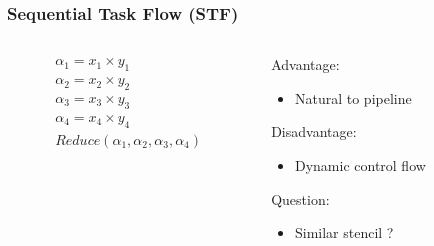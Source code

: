 \documentclass{beamer}
\begin{document}
\begin{frame}
    \frametitle{Sequential Task Flow (STF)}
    \begin{columns}[T]
        \begin{column}{0.5\textwidth}  %
            \begin{minipage}[t][.5\textheight]{\textwidth}
                \begin{center}
                    
                \end{center}
            \end{minipage}\par
            \begin{minipage}[t][.5\textheight]{\textwidth}
                \begin{equation*}
                    \begin{split}
                        \alpha_1 = x_1 \times y_1  \\
                        \alpha_2 = x_2 \times y_2 \\
                        \alpha_3 = x_3 \times y_3 \\
                        \alpha_4 = x_4 \times y_4 \\ 
                        Reduce(\alpha_1,\alpha_2,\alpha_3,\alpha_4)
                    \end{split}
                \end{equation*}
            \end{minipage}
        \end{column}

        \begin{column}{0.5\textwidth}
            \begin{minipage}[t][.5\textheight]{\textwidth}
                \begin{center}
                    
                \end{center}
            \end{minipage}\par
            \begin{minipage}[t][.5\textheight]{\textwidth}
                Advantage:
                \begin{itemize}
                    \item Natural to pipeline
                \end{itemize}
                Disadvantage:
                \begin{itemize}
                    \item Dynamic control flow
                \end{itemize}
                Question:
                \begin{itemize}
                    \item Similar stencil ?
                \end{itemize}
            \end{minipage}


        \end{column}
    \end{columns}
\end{frame}
\end{document}
